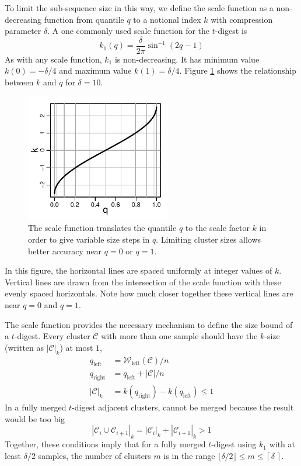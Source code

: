 \documentclass[11pt]{amsart}
\begin{document}
To limit the sub-sequence size in this way, we define the scale function as a non-decreasing function from quantile $q$ to a notional index $k$ with compression parameter $\delta$. A one commonly used  scale function for the $t$-digest is 
\[
k_1(q) = \frac \delta {2\pi}  { {\sin^{-1} (2q-1)} }    
\]
As with any scale function, $k_1$ is non-decreasing. It has minimum value  $k(0)=-\delta/4$ and maximum value  $k(1)=\delta/4$.  Figure \ref{fig:k-q-plot} shows the relationship between $k$ and $q$ for $\delta=10$. 
\begin{figure}[htbp] %
   \centering
   \includegraphics[width=2.5in]{k-q-plot.pdf} 
   \caption{The scale function translates the quantile $q$ to the scale factor $k$ in order to give variable size steps in $q$. Limiting cluster sizes allows better accuracy near $q=0$ or $q=1$. }
   \label{fig:k-q-plot}
\end{figure}
In this figure, the horizontal lines are spaced uniformly at integer values of $k$. Vertical lines are drawn from the intersection of the scale function with these evenly spaced horizontals. Note how much closer together these vertical lines are near $q=0$ and $q=1$.

The scale function provides the necessary mechanism to define the size bound of a $t$-digest. Every cluster $\mathcal C$ with more than one sample should have the $k$-size (written as $|\mathcal C|_k$) at most $1$,
\begin{align*}
q_{\mathrm {left}} &= {\mathcal W}_{\mathrm{left}}(\mathcal C)/n \\
q_{\mathrm {right}} &= q_{\mathrm {left}} + {| \mathcal C | / n}  \\
|\mathcal C|_k &= k \left (q_{\mathrm {right}} \right) - k \left ( q_{\mathrm {left}} \right) \le 1
\end{align*}
In a fully merged $t$-digest adjacent clusters, cannot be merged because the result would be too big 
\[
|\mathcal C_i \cup \mathcal C_{i+1} |_k = |\mathcal C_i|_k + |\mathcal C_{i+1}|_k > 1
\]
Together, these conditions imply that for a fully merged $t$-digest using $k_1$ with at least $\delta/2$ samples, the number of clusters $m$ is in the range $ \lfloor\delta/2\rfloor \le m \le \left \lceil\delta \,\right \rceil $. 
\end{document}
